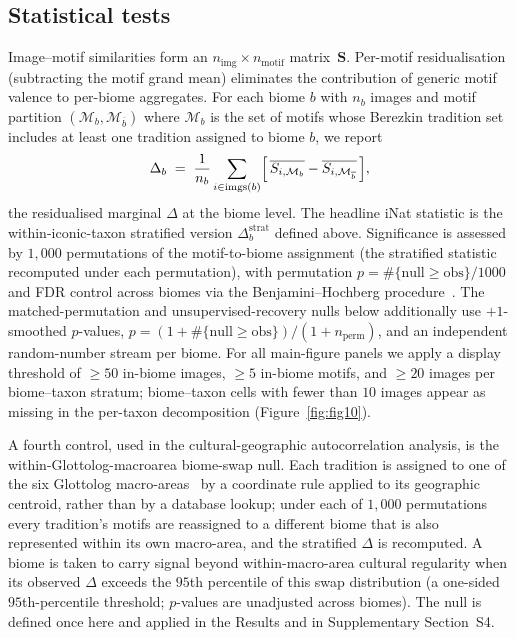 \documentclass[11pt,a4paper]{article}
\begin{document}
\subsection*{Statistical tests}

Image--motif similarities form an
$n_{\text{img}} \times n_{\text{motif}}$ matrix~$\mathbf{S}$.
Per-motif residualisation (subtracting the motif grand mean)
eliminates the contribution of generic motif valence to per-biome
aggregates. For each biome $b$ with $n_b$ images and motif
partition $(\mathcal{M}_b, \mathcal{M}_{\overline{b}})$ where
$\mathcal{M}_b$ is the set of motifs whose Berezkin tradition set
includes at least one tradition assigned to biome $b$, we report
\[
\Delta_b \;=\; \frac{1}{n_b}\sum_{i \in \text{imgs}(b)}
        \Bigl[\,\overline{S_{i,\mathcal{M}_b}}
            - \overline{S_{i,\mathcal{M}_{\overline{b}}}}\,\Bigr],
\]
the residualised marginal $\Delta$ at the biome level. The
headline iNat statistic is the within-iconic-taxon stratified
version $\Delta^{\text{strat}}_b$ defined above. Significance is
assessed by $1{,}000$ permutations of the motif-to-biome
assignment (the stratified statistic recomputed under each
permutation), with permutation $p = \#\{\text{null} \geq
\text{obs}\}/1000$ and FDR control across biomes via the
Benjamini--Hochberg procedure~\citep{benjamini1995controlling}. The
matched-permutation and unsupervised-recovery nulls below
additionally use $+1$-smoothed $p$-values, $p = (1 + \#\{\text{null}
\geq \text{obs}\})/(1 + n_{\text{perm}})$, and an independent
random-number stream per biome.
For all main-figure panels we apply a display threshold of
$\geq 50$ in-biome images, $\geq 5$ in-biome motifs, and
$\geq 20$ images per biome--taxon stratum; biome--taxon cells
with fewer than $10$ images appear as missing in the per-taxon
decomposition (Figure~\ref{fig:fig10}).

A fourth control, used in the cultural-geographic autocorrelation
analysis, is the within-Glottolog-macroarea biome-swap null. Each
tradition is assigned to one of the six Glottolog
macro-areas~\citep{hammarstrom2024glottolog} by a coordinate rule
applied to its geographic centroid, rather than by a database lookup;
under each of $1{,}000$ permutations every
tradition's motifs are reassigned to a different biome that is also
represented within its own macro-area, and the stratified $\Delta$ is
recomputed. A biome is taken to carry signal beyond within-macro-area
cultural regularity when its observed $\Delta$ exceeds the $95$th
percentile of this swap distribution (a one-sided $95$th-percentile
threshold; $p$-values are unadjusted across biomes). The null is
defined once here and applied in the
Results and in Supplementary Section~S4.
\end{document}
